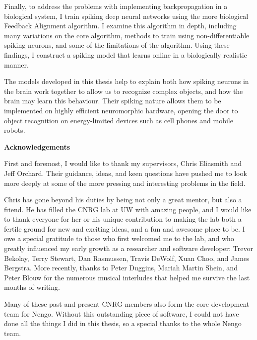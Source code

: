 Finally, to address the problems with implementing backpropagation in a biological system,
I train spiking deep neural networks using the more biological Feedback Alignment algorithm.
I examine this algorithm in depth, including many variations on the core algorithm,
methods to train using non-differentiable spiking neurons,
and some of the limitations of the algorithm.
Using these findings, I construct a spiking model that
learns online in a biologically realistic manner.

The models developed in this thesis
help to explain both how spiking neurons in the brain
work together to allow us to recognize complex objects,
and how the brain may learn this behaviour.
Their spiking nature allows them to be implemented
on highly efficient neuromorphic hardware,
opening the door to object recognition on energy-limited devices
such as cell phones and mobile robots.

\cleardoublepage


\begin{center}\textbf{Acknowledgements}\end{center}

\noindent
First and foremost,
I would like to thank my supervisors,
Chris Eliasmith and Jeff Orchard.
Their guidance, ideas, and keen questions
have pushed me to look more deeply
at some of the more pressing and interesting problems in the field.

Chris has gone beyond his duties by being not only a great mentor,
but also a friend.
He has filled the CNRG lab at UW with amazing people,
and I would like to thank everyone for her or his unique contribution
to making the lab both a fertile ground for new and exciting ideas,
and a fun and awesome place to be.
I owe a special gratitude to those who first welcomed me to the lab,
and who greatly influenced my early growth as a researcher and software developer:
Trevor Bekolay, Terry Stewart, Dan Rasmussen, Travis DeWolf, Xuan Choo,
and James Bergstra.
More recently, thanks to Peter Duggins, Mariah Martin Shein, and Peter Blouw
for the numerous musical interludes
that helped me survive the last months of writing.

Many of these past and present CNRG members
also form the core development team for Nengo.
Without this outstanding piece of software,
I could not have done all the things I did in this thesis,
so a special thanks to the whole Nengo team.

